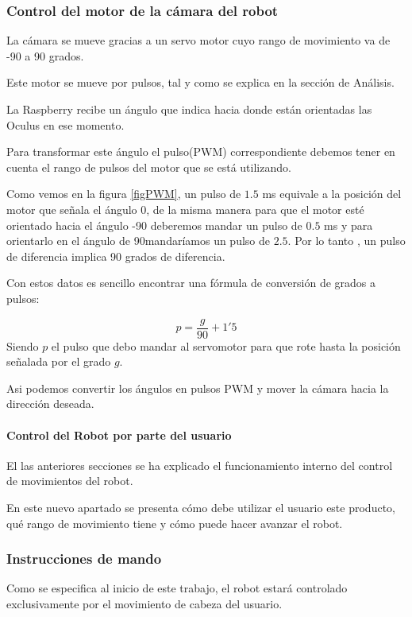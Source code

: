 \documentclass[twoside, 11pt]{epstfg}
\begin{document}
\subsubsection{\textbf{Control del motor de la cámara del robot}}

La cámara se mueve gracias a un servo motor cuyo rango de movimiento va de -90 a 90 grados.

Este motor se mueve por pulsos, tal y como se explica en la sección de Análisis.

La Raspberry recibe un ángulo que indica hacia donde están orientadas las Oculus en ese momento.

Para transformar este ángulo el pulso(PWM) correspondiente debemos tener en cuenta el rango de pulsos del motor que se está utilizando.

Como vemos en la figura \ref{figPWM}, un pulso de $1.5$ ms equivale a la posición del motor que señala el ángulo 0, de la misma manera para que el motor esté orientado hacia el ángulo -90 deberemos mandar un pulso de $0.5$ ms y para orientarlo en el ángulo de 90mandaríamos un pulso de $2.5$. Por lo tanto , un pulso de diferencia implica 90 grados de diferencia.

Con estos datos es sencillo encontrar una fórmula de conversión de grados a pulsos:

$$p = \frac{g}{90} + 1'5$$
Siendo $p$ el pulso que debo mandar al servomotor para que rote hasta la posición señalada por el grado $g$.

Asi podemos convertir los ángulos en pulsos PWM y mover la cámara hacia la dirección deseada.

\paragraph{Control del Robot por parte del usuario}

El las anteriores secciones se ha explicado el funcionamiento interno del control de movimientos del robot.

En este nuevo apartado se presenta cómo debe utilizar el usuario este producto, qué rango de movimiento tiene y cómo puede hacer avanzar el robot.

\subsubsection{\textbf{Instrucciones de mando}}

Como se especifica al inicio de este trabajo, el robot estará controlado exclusivamente por el movimiento de cabeza del usuario.
\end{document}
